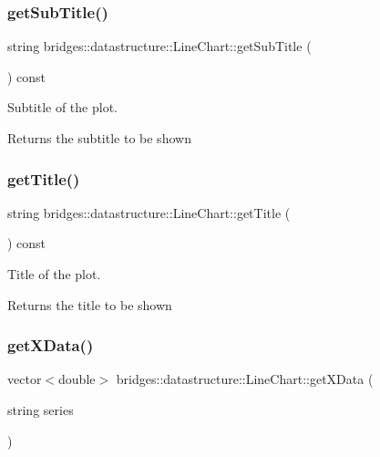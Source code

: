 \subsubsection{\texorpdfstring{get\+Sub\+Title()}{getSubTitle()}}
{\footnotesize\ttfamily string bridges\+::datastructure\+::\+Line\+Chart\+::get\+Sub\+Title (\begin{DoxyParamCaption}{ }\end{DoxyParamCaption}) const\hspace{0.3cm}{\ttfamily [inline]}}



Subtitle of the plot. 

\begin{DoxyReturn}{Returns}
the subtitle to be shown 
\end{DoxyReturn}
\mbox{\label{classbridges_1_1datastructure_1_1_line_chart_aa38d6cf9657d2757a98b657f079ae2bc}} 
\subsubsection{\texorpdfstring{get\+Title()}{getTitle()}}
{\footnotesize\ttfamily string bridges\+::datastructure\+::\+Line\+Chart\+::get\+Title (\begin{DoxyParamCaption}{ }\end{DoxyParamCaption}) const\hspace{0.3cm}{\ttfamily [inline]}}



Title of the plot. 

\begin{DoxyReturn}{Returns}
the title to be shown 
\end{DoxyReturn}
\mbox{\label{classbridges_1_1datastructure_1_1_line_chart_af624657af0ddd7d58c1d9290b4874280}} 
\subsubsection{\texorpdfstring{get\+X\+Data()}{getXData()}}
{\footnotesize\ttfamily vector$<$double$>$ bridges\+::datastructure\+::\+Line\+Chart\+::get\+X\+Data (\begin{DoxyParamCaption}\item[{string}]{series }\end{DoxyParamCaption})\hspace{0.3cm}{\ttfamily [inline]}}



